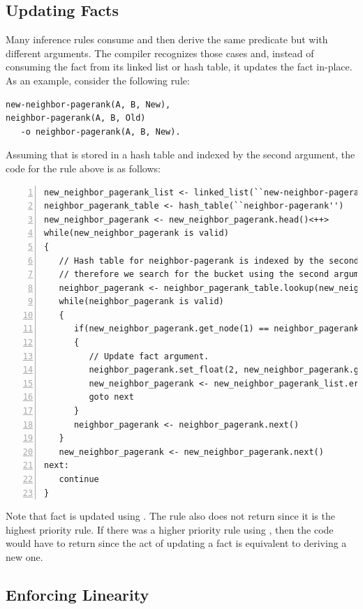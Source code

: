 \subsection{Updating Facts}

Many inference rules consume and then derive the same predicate but with
different arguments. The compiler recognizes those cases and, instead of
consuming the fact from its linked list or hash table, it updates the fact
in-place. As an example, consider the following rule:

\begin{Verbatim}[fontsize=\codesize]
new-neighbor-pagerank(A, B, New),
neighbor-pagerank(A, B, Old)
   -o neighbor-pagerank(A, B, New).
\end{Verbatim}

Assuming that  is stored in a hash table and indexed by
the second argument, the code for the rule above is as follows:

\begin{Verbatim}[numbers=left,fontsize=\codesize]
new_neighbor_pagerank_list <- linked_list(``new-neighbor-pagerank'')
neighbor_pagerank_table <- hash_table(``neighbor-pagerank'')
new_neighbor_pagerank <- new_neighbor_pagerank.head()<++>
while(new_neighbor_pagerank is valid)
{
   // Hash table for neighbor-pagerank is indexed by the second argument,
   // therefore we search for the bucket using the second argument of new-neighbor-pagerank.
   neighbor_pagerank <- neighbor_pagerank_table.lookup(new_neighbor_pagerank.get_node(1))
   while(neighbor_pagerank is valid)
   {
      if(new_neighbor_pagerank.get_node(1) == neighbor_pagerank.get_node(1))
      {
         // Update fact argument.
         neighbor_pagerank.set_float(2, new_neighbor_pagerank.get_float(2))
         new_neighbor_pagerank <- new_neighbor_pagerank_list.erase(new_neighbor_pagerank)
         goto next
      }
      neighbor_pagerank <- neighbor_pagerank.next()
   }
   new_neighbor_pagerank <- new_neighbor_pagerank.next()
next:
   continue
}
\end{Verbatim}

Note that  fact is updated using . The
rule also does not return since it is the highest priority rule. If there was a
higher priority rule using , then the code would have to
return since the act of updating a fact is equivalent to deriving a new one.

\subsection{Enforcing Linearity}

